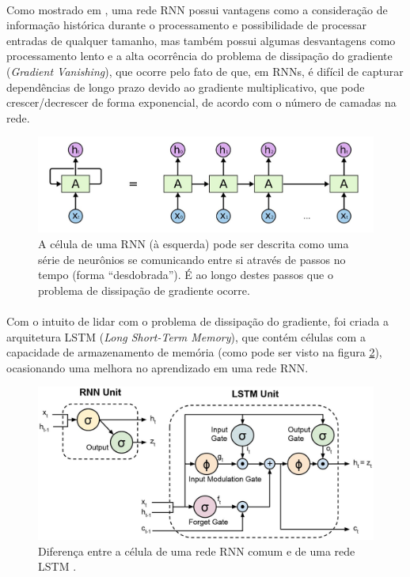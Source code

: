 \documentclass[grad,numbers]{coppe}
\begin{document}
	  	\paragraph{}Como mostrado em \cite{rnn-cheatsheet}, uma rede RNN possui vantagens como a consideração de informação histórica durante o processamento e possibilidade de processar entradas de qualquer tamanho, mas também possui algumas desvantagens como processamento lento e a alta ocorrência do problema de dissipação do gradiente (\textit{Gradient Vanishing}), que ocorre pelo fato de que, em RNNs, é difícil de capturar dependências de longo prazo devido ao gradiente multiplicativo, que pode crescer/decrescer de forma exponencial, de acordo com o número de camadas na rede.
	  	\begin{figure}[h]
	  		\centering
	  		\includegraphics[width=13cm]{rnn-cell.jpg}
	  		\caption{A célula de uma RNN (à esquerda) pode ser descrita como uma série de neurônios se comunicando entre si através de passos no tempo (forma ``desdobrada'')\cite{understanding-lstm}. É ao longo destes passos que o problema de dissipação de gradiente ocorre.}
	  		\label{fig:rnn-cell-fig}
	  	\end{figure}
	  	\paragraph{}Com o intuito de lidar com o problema de dissipação do gradiente, foi criada a arquitetura LSTM (\textit{Long Short-Term Memory})\cite{lstm-paper}, que contém células com a capacidade de armazenamento de memória (como pode ser visto na figura \ref{fig:lstm_rnn_comparisson-fig}), ocasionando uma melhora no aprendizado em uma rede RNN.
	  	\begin{figure}[H]
	  		\centering
	  		\includegraphics[width=12cm]{lstm_rnn_comparisson.jpg}
	  		\caption{Diferença entre a célula de uma rede RNN comum e de uma rede LSTM \cite{lstm-visual}.}
	  		\label{fig:lstm_rnn_comparisson-fig}
	  	\end{figure}
\end{document}
